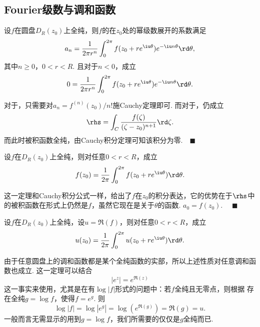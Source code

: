 
\subsection{Fourier级数与调和函数}

  \begin{thm}
    \label{thm: 幂级数系数、积分}
    设$f$在圆盘$D_R(z_0)$上全纯，则$f$的在$z_0$处的幂级数展开的系数满足
    \begin{equation}
      \label{equ: 幂级数系数}
      a_n = \frac{1}{2\pi r^n}\int_0^{2\pi}f(z_0+re^{\iu\theta})e^{-\iu n\theta}\rd\theta,
    \end{equation}
    其中$n\ge 0$，$0<r<R$. 且对于$n<0$，成立
    \begin{equation}
      \label{equ: 幂级数系数2}
      0 = \frac{1}{2\pi r^n}\int_0^{2\pi}f(z_0+re^{\iu\theta})e^{-\iu n\theta}\rd\theta.
    \end{equation}
  \end{thm}
  \proof
    对于，只需要对$a_n = f^{(n)}(z_0)/n!$施Cauchy定理即可.
    而对于，仍成立
    \[
      \rhs = \int_C\frac{f(\zeta)}{(\zeta-z_0)^{n+1}}\rd\zeta.
    \]
    而此时被积函数全纯，由Cauchy积分定理可知该积分为零.$\quad\blacksquare$

  \begin{cor}[中值]
    \label{cor: 中值}
    设$f$在$D_R(z_0)$上全纯，则对任意$0<r<R$，成立
    \[
      f(z_0) = \frac{1}{2\pi}\int_0^{2\pi}f(z_0+re^{\iu\theta})\rd\theta.
    \]
  \end{cor}
  \remark
    这一定理和Cauchy积分公式一样，给出了$f$在$z_0$的积分表达，它的优势在于$\rhs$中
    的被积函数在形式上仍然是$f$，虽然它现在是关于$\theta$的函数.
  \proof
    $a_0 = f(z_0)$. $\quad\blacksquare$

  \begin{cor}
    \label{cor: 全纯、实部}
    设$f$在$D_R(z_0)$上全纯，设$u=\Re(f)$，则对任意$0<r<R$，成立
    \[
      u(z_0) = \frac{1}{2\pi}\int_0^{2\pi}u(z_0+re^{\iu\theta})\rd\theta.
    \]
  \end{cor}
  \remark
    由于任意圆盘上的调和函数都是某个全纯函数的实部，所以上述性质对任意调和函数也成立.
    这一定理可以结合
    \[
      |e^z| = e^{\Re(z)}
    \]
    这一事实来使用，尤其是在有$\log|f|$形式的问题中：若$f$全纯且无零点，则根据
    存在全纯$g=\log f$，使得$f=e^g$. 则
    \[
      \log|f| = \log|e^g| = \log(e^{\Re(g)}) = \Re(g) = u.
    \]
    一般而言无需显示的用到$g=\log f$，我们所需要的仅仅是$g$全纯而已.

